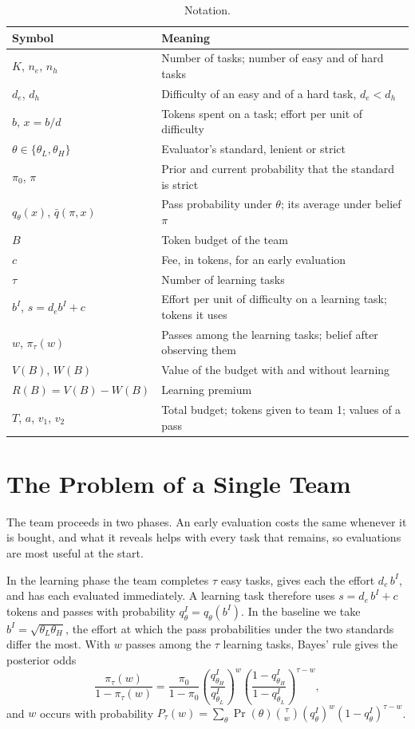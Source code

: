 \documentclass[11pt]{article}
\begin{document}
\begin{table}[htbp]
\centering
\small
\begin{tabular}{@{}ll@{}}
\toprule
Symbol & Meaning \\
\midrule
$K$, $n_e$, $n_h$ & Number of tasks; number of easy and of hard tasks \\
$d_e$, $d_h$ & Difficulty of an easy and of a hard task, $d_e<d_h$ \\
$b$, $x=b/d$ & Tokens spent on a task; effort per unit of difficulty \\
$\theta\in\{\theta_L,\theta_H\}$ & Evaluator's standard, lenient or strict \\
$\pi_0$, $\pi$ & Prior and current probability that the standard is strict \\
$q_\theta(x)$, $\bar q(\pi,x)$ & Pass probability under $\theta$; its average under belief $\pi$ \\
$B$ & Token budget of the team \\
$c$ & Fee, in tokens, for an early evaluation \\
$\tau$ & Number of learning tasks \\
$b^I$, $s=d_e b^I+c$ & Effort per unit of difficulty on a learning task; tokens it uses \\
$w$, $\pi_\tau(w)$ & Passes among the learning tasks; belief after observing them \\
$V(B)$, $W(B)$ & Value of the budget with and without learning \\
$R(B)=V(B)-W(B)$ & Learning premium \\
$T$, $a$, $v_1$, $v_2$ & Total budget; tokens given to team 1; values of a pass \\
\bottomrule
\end{tabular}
\caption{Notation.}
\end{table}

\section{The Problem of a Single Team}\label{sec:team}

The team proceeds in two phases. An early evaluation costs the same whenever it is bought, and what it reveals helps with every task that remains, so evaluations are most useful at the start.

In the learning phase the team completes $\tau$ easy tasks, gives each the effort $d_e\,b^I$, and has each evaluated immediately. A learning task therefore uses $s=d_e\,b^I+c$ tokens and passes with probability $q_\theta^I=q_\theta(b^I)$. In the baseline we take $b^I=\sqrt{\theta_L\theta_H}$, the effort at which the pass probabilities under the two standards differ the most. With $w$ passes among the $\tau$ learning tasks, Bayes' rule gives the posterior odds
\[
\frac{\pi_\tau(w)}{1-\pi_\tau(w)}=\frac{\pi_0}{1-\pi_0}\left(\frac{q_{\theta_H}^I}{q_{\theta_L}^I}\right)^{w}\left(\frac{1-q_{\theta_H}^I}{1-q_{\theta_L}^I}\right)^{\tau-w},
\]
and $w$ occurs with probability $P_\tau(w)=\sum_\theta\Pr(\theta)\binom{\tau}{w}(q_\theta^I)^w(1-q_\theta^I)^{\tau-w}$.
\end{document}
